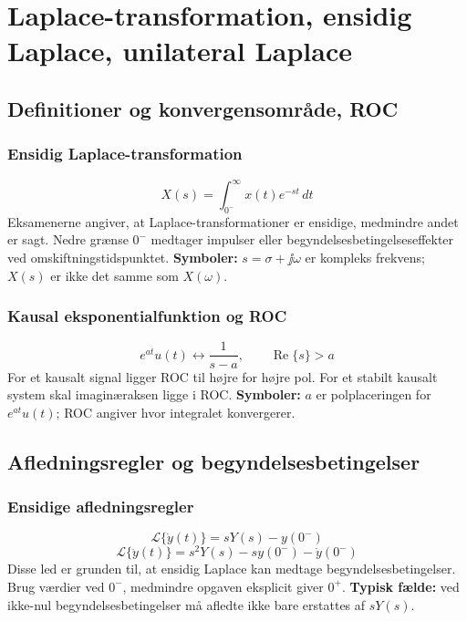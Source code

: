 \section{Laplace-transformation, ensidig Laplace, unilateral Laplace}

\subsection{Definitioner og konvergensområde, ROC}

\subsubsection{Ensidig Laplace-transformation}
\[
X(s)=\int_{0^-}^{\infty}x(t)e^{-st}\,dt
\]
Eksamenerne angiver, at Laplace-transformationer er ensidige, medmindre andet er sagt. Nedre grænse \(0^-\) medtager impulser eller begyndelsesbetingelseseffekter ved omskiftningstidspunktet.
\textbf{Symboler:} \(s=\sigma+\jj\omega\) er kompleks frekvens; \(X(s)\) er ikke det samme som \(X(\omega)\).

\subsubsection{Kausal eksponentialfunktion og ROC}
\[
e^{at}u(t)\leftrightarrow \frac{1}{s-a},\qquad \operatorname{Re}\{s\}>a
\]
For et kausalt signal ligger ROC til højre for højre pol. For et stabilt kausalt system skal imaginæraksen ligge i ROC.
\textbf{Symboler:} \(a\) er polplaceringen for \(e^{at}u(t)\); ROC angiver hvor integralet konvergerer.

\subsection{Afledningsregler og begyndelsesbetingelser}

\subsubsection{Ensidige afledningsregler}
\[
\mathcal{L}\{\dot y(t)\}=sY(s)-y(0^-)
\]
\[
\mathcal{L}\{\ddot y(t)\}=s^2Y(s)-s y(0^-)-\dot y(0^-)
\]
Disse led er grunden til, at ensidig Laplace kan medtage begyndelsesbetingelser. Brug værdier ved \(0^-\), medmindre opgaven eksplicit giver \(0^+\).
\textbf{Typisk fælde:} ved ikke-nul begyndelsesbetingelser må afledte ikke bare erstattes af \(sY(s)\).


